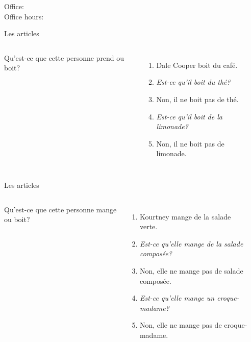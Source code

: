 \documentclass{beamer}
\subtitle[Casse-croûtes et articles]{Les casse-croûtes et les articles}
\begin{document}
  \begin{frame}
    \titlepage
    \tiny{Office: \\
          Office hours: }
  \end{frame}

  \begin{frame}{Les articles}
    \begin{columns}
        Qu'est-ce que cette personne prend ou boit?
        \begin{enumerate}
          \item<2-> Dale Cooper boit du café.
          \item<2-> \emph{Est-ce qu'il boit du thé?}
          \item<3-> Non, il ne boit pas de thé.
          \item<3-> \emph{Est-ce qu'il boit de la limonade?}
          \item<4-> Non, il ne boit pas de limonade.
        \end{enumerate}
        \begin{minipage}[c][0.6\textwidth]{\linewidth}
          \begin{center}
          \end{center}
        \end{minipage}
    \end{columns}
  \end{frame}

  \begin{frame}{Les articles}
    \begin{columns}
        Qu'est-ce que cette personne mange ou boit?
        \begin{enumerate}
          \item<2-> Kourtney mange de la salade verte.
          \item<2-> \emph{Est-ce qu'elle mange de la salade composée?}
          \item<3-> Non, elle ne mange pas de salade composée.
          \item<3-> \emph{Est-ce qu'elle mange un croque-madame?}
          \item<4-> Non, elle ne mange pas de croque-madame.
        \end{enumerate}
        \begin{minipage}[c][0.6\textwidth]{\linewidth}
          \begin{center}
          \end{center}
        \end{minipage}
    \end{columns}
  \end{frame}
\end{document}
